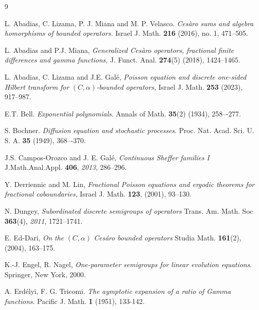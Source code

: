 \documentclass[a4paper,12pt]{amsart}
\theoremstyle{definition}
\theoremstyle{remark}
\begin{document}
\begin{thebibliography}{9}

 L. Abadias, C. Lizama, P. J. Miana and M. P. Velasco. {\it Ces\`{a}ro sums and algebra homorphisms of  bounded operators.} Israel J. Math. {\bf 216} (2016), no. 1, 471–505.

 L. Abadias and P.J. Miana, {\it Generalized {C}es\`aro operators, fractional finite differences and gamma functions,} J. Funct. Anal. {\bf 274}(5) (2018), 1424--1465.





 L. Abadias, C. Lizama and J.E. Gal\'e, {\it Poisson equation and discrete one-sided Hilbert transform for $(C,\alpha)$-bounded operators,} Israel J. Math. {\bf 253} (2023), 917--987.

 E.T. Bell. {\it Exponential polynomials}.
Annals of Math. {\bf 35}(2) (1934), 258–-277.

 S. Bochner. {\it Diffusion equation and stochastic processes}.
Proc. Nat. Acad. Sci. U. S. A. {\bf 35} (1949), 368–-370.

  J.S. Campos-Orozco and J. E. Gal\'e, {\it Continuous Sheffer families I } {J.Math.Anal.Appl.} \textbf{406}, \emph{2013}, 286--296.




 Y. Derriennic and M. Lin, {\it Fractional Poisson equations and ergodic theorems for fractional coboundaries,}
Israel J. Math. \textbf{123}, (2001), 93--130.

  N. Dungey, {\it Subordinated discrete semigroups of operators } {Trans. Am. Math. Soc} \textbf{363}(4), \emph{2011}, 1721--1741.

  E. Ed-Dari, {\it On the $(C,\alpha)$ Cesáro bounded operators} {Studia Math.} \textbf{161}(2), (2004), 163--175.





 K.-J. Engel, R. Nagel, {\it One-parameter semigroups for linear evolution equations}. Springer,
New York, 2000.

 A. Erd\'elyi, F. G. Tricomi. {\it The aymptotic expansion of a ratio of Gamma functions.} Pacific J. Math. {\bf 1} (1951), 133-142.


\end{thebibliography}
\end{document}
